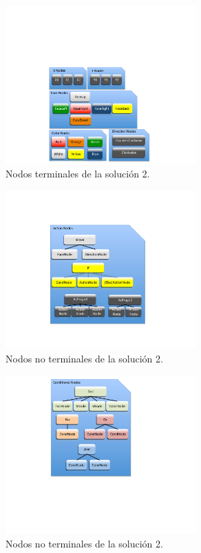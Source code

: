 \begin{figure}[t]
\centering
\includegraphics[width=0.65\textwidth]{figs/pdf/leng2nodosterm}
\caption{Nodos terminales de la solución 2.}
\label{fig:leng2nodosterm}
\end{figure}

\begin{figure}[t]
\centering
\includegraphics[width=0.65\textwidth]{figs/pdf/leng2nodosnotermaction}
\caption{Nodos no terminales de la solución 2.}
\label{fig:leng2nodosnotermaction}
\end{figure}

\begin{figure}[t]
\centering
\includegraphics[width=0.65\textwidth]{figs/pdf/leng2nodosnotermcond}
\caption{Nodos no terminales de la solución 2.}
\label{fig:leng2nodosnotermcond}
\end{figure}


